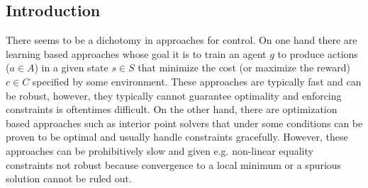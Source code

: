 \subsection{Introduction}
% 
% 
% 
% 
There seems to be a dichotomy in approaches for control. On one hand there are learning based approaches whose goal it is to train an agent $g$ to produce actions ($a \in A$) in a given state $s \in S$ that minimize the cost (or maximize the reward) $c \in C$ specified by some environment. These approaches are typically fast and can be robust, however, they typically cannot guarantee optimality and enforcing constraints is oftentimes difficult. On the other hand, there are optimization based approaches such as interior point solvers that under some conditions can be proven to be optimal and usually handle constraints gracefully. However, these approaches can be prohibitively slow and given e.g. non-linear equality constraints not robust because convergence to a local minimum or a spurious solution cannot be ruled out.\\
